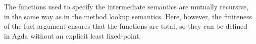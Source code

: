 \begin{AgdaAlign}
The functions used to specify the intermediate semantics are mutually recursive,
in the same way as in the method lookup semantics.
Here, however, the finiteness of the fuel argument ensures that the functions are total,
so they can be defined in Agda without an explicit least fixed-point:
%
\begin{code}%
%
\>[2]%
\>[11]\AgdaSymbol{:}\AgdaSpace{}%
\AgdaSpace{}%
\AgdaSpace{}%
\AgdaSpace{}%
\AgdaSpace{}%
\AgdaSpace{}%
\AgdaSpace{}%
\<%
\\
%
\>[2]%
\>[11]\AgdaSymbol{:}\AgdaSpace{}%
\AgdaSpace{}%
\AgdaSpace{}%
\AgdaSpace{}%
\AgdaSpace{}%
\AgdaSpace{}%
\AgdaSpace{}%
\AgdaSpace{}%
\AgdaSpace{}%
\<%
\\
%
\>[2]%
\>[11]\AgdaSymbol{:}\AgdaSpace{}%
\AgdaSpace{}%
\AgdaSpace{}%
\AgdaSpace{}%
\AgdaSpace{}%
\AgdaSpace{}%
\AgdaSpace{}%
\AgdaSpace{}%
\AgdaSpace{}%
\AgdaSpace{}%
\AgdaSpace{}%
\<%
\\
%
\\[\AgdaEmptyExtraSkip]%
%
\>[2]\AgdaSpace{}%
\AgdaSpace{}%
\AgdaSpace{}%
\AgdaSymbol{=}\AgdaSpace{}%
\AgdaSpace{}%
\AgdaSpace{}%
\AgdaSymbol{(}\AgdaSpace{}%
\AgdaSymbol{)}\AgdaSpace{}%
\<%
\\
%
\\[\AgdaEmptyExtraSkip]%
%
\>[2]\AgdaSpace{}%
\AgdaSpace{}%
\AgdaSpace{}%
%
\>[27]\AgdaSymbol{=}\AgdaSpace{}%
\<%
\\
%
\>[2]\AgdaSpace{}%
\AgdaSpace{}%
\AgdaCatchallClause{\AgdaSymbol{(}}\AgdaSpace{}%
\AgdaSpace{}%
\AgdaCatchallClause{\AgdaSymbol{)}}\AgdaSpace{}%

\end{code}
\end{AgdaAlign}
